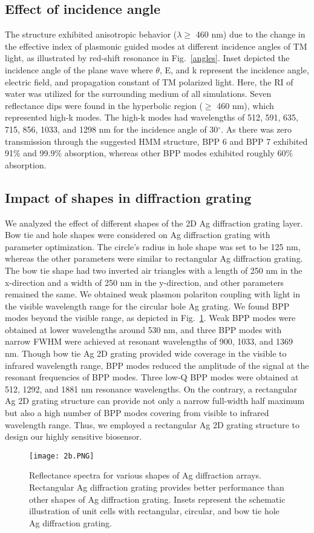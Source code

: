\documentclass[conference]{IEEEtran}
\begin{document}
\subsection{Effect of incidence angle}
The structure exhibited anisotropic behavior ($\lambda \geq$ 460 nm) due to the change in the effective index of plasmonic guided modes at different incidence angles of TM light, as illustrated by red-shift resonance in Fig.~\ref{angles}. Inset depicted the incidence angle of the plane wave where $\theta$, E, and k represent the incidence angle, electric field, and propagation constant of TM polarized light. Here, the RI of water was utilized for the surrounding medium of all simulations. Seven reflectance dips were found in the hyperbolic region ($\geq$ 460 nm), which represented high-k modes. The high-k modes had wavelengths of 512, 591, 635, 715, 856, 1033, and 1298 nm for the incidence angle of 30$^{\circ}$. As there was zero transmission through the suggested HMM structure, BPP 6 and BPP 7 exhibited 91\% and 99.9\% absorption, whereas other BPP modes exhibited roughly 60\% absorption.   

\subsection{Impact of shapes in diffraction grating}
We analyzed the effect of different shapes of the 2D Ag diffraction grating layer. Bow tie and hole shapes were considered on Ag diffraction grating with parameter optimization. The circle's radius in hole shape was set to be 125 nm, whereas the other parameters were similar to rectangular Ag diffraction grating. The bow tie shape had two inverted air triangles with a length of 250 nm in the x-direction and a width of 250 nm in the y-direction, and other parameters remained the same. We obtained weak plasmon polariton coupling with light in the visible wavelength range for the circular hole Ag grating. We found BPP modes beyond the visible range, as depicted in Fig.~\ref{fig:4}. Weak BPP modes were obtained at lower wavelengths around 530 nm, and three BPP modes with narrow FWHM were achieved at resonant wavelengths of 900, 1033, and 1369 nm. Though bow tie Ag 2D grating provided wide coverage in the visible to infrared wavelength range, BPP modes reduced the amplitude of the signal at the resonant frequencies of BPP modes. Three low-Q BPP modes were obtained at 512, 1292, and 1881 nm resonance wavelengths. On the contrary, a rectangular Ag 2D grating structure can provide not only a narrow full-width half maximum but also a high number of BPP modes covering from visible to infrared wavelength range. Thus, we employed a rectangular Ag 2D grating structure to design our highly sensitive biosensor.  
\begin{figure}[ht]
\centering
\texttt{[image: 2b.PNG]}
\caption{Reflectance spectra for various shapes of Ag diffraction arrays. Rectangular Ag diffraction grating provides better performance than other shapes of Ag diffraction grating. Insets represent the schematic illustration of unit cells with rectangular, circular, and bow tie hole Ag diffraction grating.}
\label{fig:4}
\end{figure}
\end{document}
